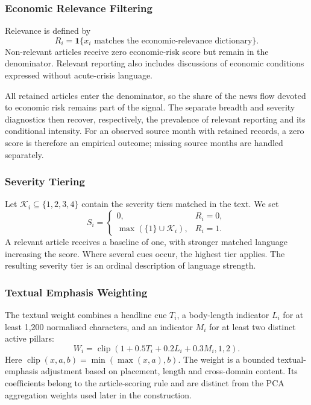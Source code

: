 \documentclass[12pt]{article}
\newcommand{\clip}{\operatorname{clip}}
\newcommand{\ind}{\mathbf{1}}
\begin{document}
\subsubsection{Economic Relevance Filtering}\label{sec:relevance_filter}
Relevance is defined by
\begin{equation}R_i=\ind\{x_i\text{ matches the economic-relevance dictionary}\}.\label{eq:relevance}\end{equation}
Non-relevant articles receive zero economic-risk score but remain in the denominator. Relevant reporting also includes discussions of economic conditions expressed without acute-crisis language.

All retained articles enter the denominator, so the share of the news flow devoted to economic risk remains part of the signal. The separate breadth and severity diagnostics then recover, respectively, the prevalence of relevant reporting and its conditional intensity. For an observed source month with retained records, a zero score is therefore an empirical outcome; missing source months are handled separately.
\subsubsection{Severity Tiering}\label{sec:severity_tiering}
Let $\mathcal K_i\subseteq\{1,2,3,4\}$ contain the severity tiers matched in the text. We set
\begin{equation} S_i=\begin{cases}0,&R_i=0,\\ \max(\{1\}\cup\mathcal K_i),&R_i=1.\end{cases}\label{eq:severity}\end{equation}
A relevant article receives a baseline of one, with stronger matched language increasing the score. Where several cues occur, the highest tier applies. The resulting severity tier is an ordinal description of language strength.
\subsubsection{Textual Emphasis Weighting}\label{sec:confidence_weighting}
The textual weight combines a headline cue $T_i$, a body-length indicator $L_i$ for at least 1,200 normalised characters, and an indicator $M_i$ for at least two distinct active pillars:
\begin{equation}W_i=\clip(1+0.5T_i+0.2L_i+0.3M_i,1,2).\label{eq:confidence}\end{equation}
Here $\clip(x,a,b)=\min(\max(x,a),b)$. The weight is a bounded textual-emphasis adjustment based on placement, length and cross-domain content. Its coefficients belong to the article-scoring rule and are distinct from the PCA aggregation weights used later in the construction.
\end{document}
